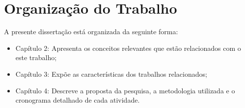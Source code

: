 \section{Organização do Trabalho}

	A presente dissertação está organizada da seguinte forma:
	
    \begin{itemize}
    	\item Capítulo 2: Apresenta os conceitos relevantes que estão relacionados com o este trabalho;
        \item Capítulo 3: Expõe as características dos trabalhos relacionados;
        \item Capítulo 4: Descreve a proposta da pesquisa, a metodologia utilizada e o cronograma detalhado de cada atividade.
    \end{itemize}